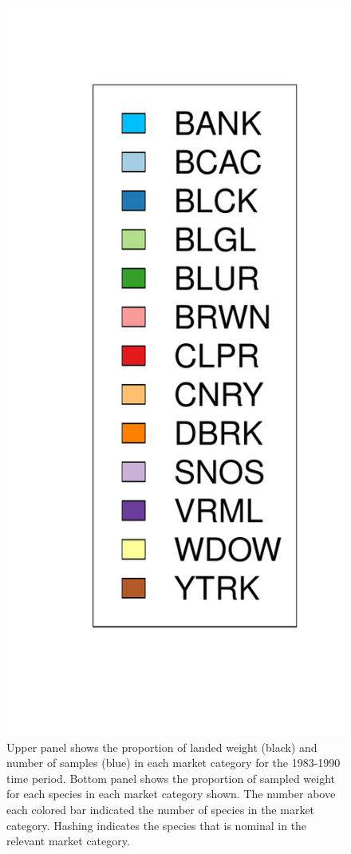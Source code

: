 \documentclass[12pt]{article}
\begin{document}
\begin{landscape}
\begin{figure}[h!]
\includegraphics[height=0.8\textheight]{./pictures/barplotLegend.pdf}
\caption{Upper panel shows the proportion of landed weight (black) and number of                 
samples (blue) in each market category for the 1983-1990 time period. Bottom panel 
shows the proportion of sampled weight for each species in each market category 
shown. The number above each colored bar indicated the number of species in 
the market category. Hashing indicates the species that is nominal in the relevant 
market category.}
\label{bar83}
\end{figure}
\end{landscape}
\end{document}
